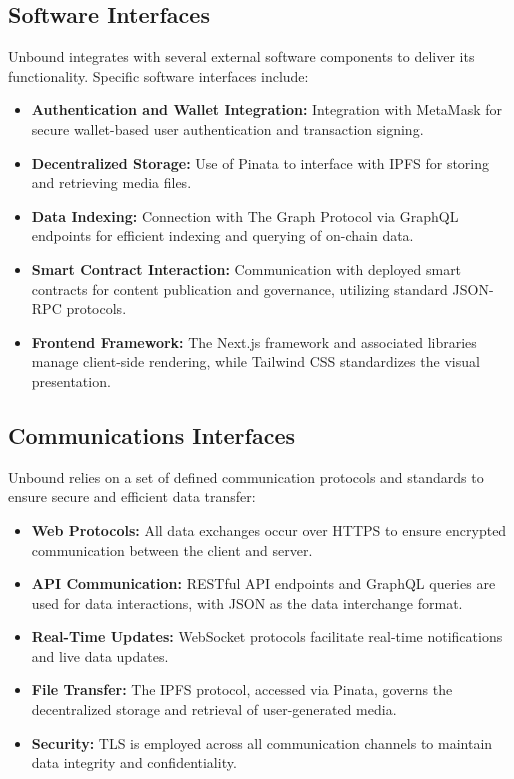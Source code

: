 \documentclass[a4paper,12pt]{article}
\begin{document}
\subsection{Software Interfaces}
Unbound integrates with several external software components to deliver its functionality. Specific software interfaces include:
\begin{itemize}
    \item \textbf{Authentication and Wallet Integration:} Integration with MetaMask for secure wallet-based user authentication and transaction signing.
    \item \textbf{Decentralized Storage:} Use of Pinata to interface with IPFS for storing and retrieving media files.
    \item \textbf{Data Indexing:} Connection with The Graph Protocol via GraphQL endpoints for efficient indexing and querying of on-chain data.
    \item \textbf{Smart Contract Interaction:} Communication with deployed smart contracts for content publication and governance, utilizing standard JSON-RPC protocols.
    \item \textbf{Frontend Framework:} The Next.js framework and associated libraries manage client-side rendering, while Tailwind CSS standardizes the visual presentation.
\end{itemize}

\subsection{Communications Interfaces}
Unbound relies on a set of defined communication protocols and standards to ensure secure and efficient data transfer:
\begin{itemize}
    \item \textbf{Web Protocols:} All data exchanges occur over HTTPS to ensure encrypted communication between the client and server.
    \item \textbf{API Communication:} RESTful API endpoints and GraphQL queries are used for data interactions, with JSON as the data interchange format.
    \item \textbf{Real-Time Updates:} WebSocket protocols facilitate real-time notifications and live data updates.
    \item \textbf{File Transfer:} The IPFS protocol, accessed via Pinata, governs the decentralized storage and retrieval of user-generated media.
    \item \textbf{Security:} TLS is employed across all communication channels to maintain data integrity and confidentiality.
\end{itemize}
\end{document}
